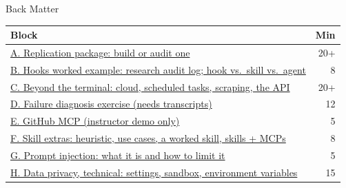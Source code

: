 \documentclass[aspectratio=169, 11pt]{beamer}
\begin{document}

\appendix

\begin{frame}[label=backmatter]{Back Matter}
  \small
  \begin{tabular}{@{}lr@{}}
    \toprule
    \textbf{Block} & \textbf{Min} \\
    \midrule
    \hyperlink{repl}{A. Replication package: build or audit one} & 20+ \\
    \hyperlink{hooksx}{B. Hooks worked example: research audit log; hook vs.\ skill vs.\ agent} & 8 \\
    \hyperlink{beyond}{C. Beyond the terminal: cloud, scheduled tasks, scraping, the API} & 20+ \\
    \hyperlink{failure}{D. Failure diagnosis exercise (needs transcripts)} & 12 \\
    \hyperlink{ghmcp}{E. GitHub MCP (instructor demo only)} & 5 \\
    \hyperlink{skillextras}{F. Skill extras: heuristic, use cases, a worked skill, skills + MCPs} & 8 \\
    \hyperlink{pinj}{G. Prompt injection: what it is and how to limit it} & 5 \\
    \hyperlink{privtech}{H. Data privacy, technical: settings, sandbox, environment variables} & 15 \\
    \bottomrule
  \end{tabular}
\end{frame}

\end{document}
